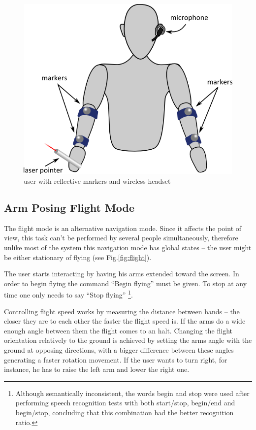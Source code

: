 \begin{figure}[ht]
	\centering
		\includegraphics[scale=1.3]{gfx/markers2.png}
	\caption{user with reflective markers and wireless headset}
	\label{fig:markers2}
\end{figure}



\subsection{Arm Posing Flight Mode}

The flight mode is an alternative navigation mode. Since it affects the point of view, this task can't be performed by
several people simultaneously, therefore unlike most of the system this navigation mode has global states
-- the user might be either stationary of flying (see Fig.\ref{fig:flight}).

The user starts interacting by having his arms extended toward the screen.
In order to begin flying the command ``Begin flying'' must be given.
To stop at any time one only needs to say ``Stop flying''
\footnote{Although semantically inconsistent, the words begin and stop were used after performing speech recognition
tests with both start/stop, begin/end and begin/stop, concluding that this combination had the better recognition ratio.}.

Controlling flight speed works by measuring the distance between hands -- the closer they are to each other the faster
the flight speed is. If the arms do a wide enough angle between them the flight comes to an halt.
Changing the flight orientation relatively to the ground is achieved by setting the arms angle with the ground at opposing directions,
with a bigger difference between these angles generating a faster rotation movement. If the user wants to turn right, for instance,
he has to raise the left arm and lower the right one.

